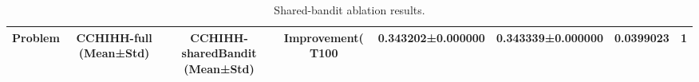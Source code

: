 \begin{table}[t]
\centering
\caption{Shared-bandit ablation results.}
\label{tab:shared_bandit_ablation}
\begin{tabular}{lcccc}
\hline
Problem & CCHIHH-full (Mean±Std) & CCHIHH-sharedBandit (Mean±Std) & Improvement(%
\hline
T100 & 0.343202±0.000000 & 0.343339±0.000000 & 0.0399023 & 1 \\
\hline
\end{tabular}
\end{table}